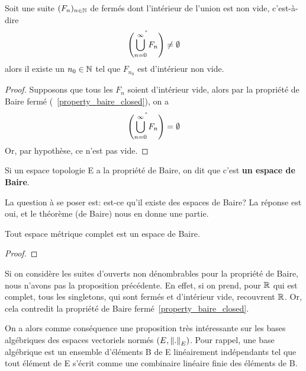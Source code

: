 \begin{corollary}
\label{corollary_baire_int_non_empty}
	Soit une suite $(F_{n})_{n \in \mathbb{N}}$ de fermés dont l'intérieur de
	l'union est non vide, c'est-à-dire 
	\begin{equation}
		\mathring{\left(\bigcup_{n = 0}^{\infty}{F_{n}}\right)} \neq \emptyset
	\end{equation}
	alors il existe un $n_{0} \in \mathbb{N}$ tel que $F_{n_{0}}$
	est d'intérieur non vide.
\end{corollary}

\ifdefined\outputproof
\begin{proof}
	Supposons que tous les $F_{n}$ soient d'intérieur vide, alors par la
	propriété de Baire fermé (~\ref{property_baire_closed}), on a
	\begin{equation}
		\mathring{\left(\bigcup_{n = 0}^{\infty}{F_{n}} \right)} = \emptyset
	\end{equation}
	Or, par hypothèse, ce n'est pas vide.
\end{proof}
\fi

\begin{definition} 
\label{definition_baire_space}
	Si un espace topologie E a la propriété de Baire, on dit que c'est \textbf{un espace
	de Baire}.
\end{definition}

La question à se poser est: est-ce qu'il existe des espaces de Baire? La
réponse est oui, et le théorème (de Baire) nous en donne une partie.

\begin{theorem} 
\label{theorem_baire_complete_space}
	Tout espace métrique complet est un espace de Baire.
\end{theorem}

\ifdefined\outputproof
\begin{proof}

\end{proof}
\fi

\begin{remarque}
	Si on considère les suites d'ouverts non dénombrables pour la propriété de
	Baire, nous n'avons pas la proposition précédente.
	En effet, si on prend, pour $\mathbb{R}$ qui est complet, tous les singletons,
	qui sont fermés et d'intérieur vide, recouvrent $\mathbb{R}$. Or, cela
	contredit la propriété de Baire fermé~\ref{property_baire_closed}.
\end{remarque}

On a alors comme conséquence une proposition très intéressante sur les bases
algébriques des espaces vectoriels normés
$(E, \norm{.}_{E})$. Pour rappel, une base algébrique
est un ensemble d'éléments B de E linéairement indépendants tel que tout élément
de E s'écrit comme une combinaire linéaire finie des éléments de B.


